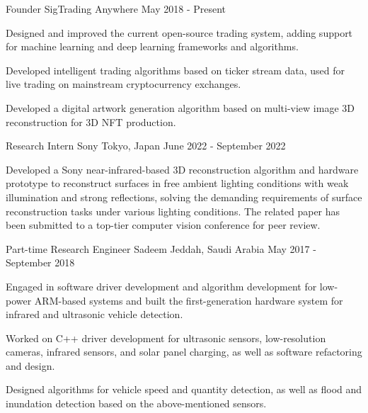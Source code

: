 

\begin{cventries}

\cventry
{Founder} %
{SigTrading} %
{Anywhere} %
{May 2018 - Present} %
{
	\begin{cvitems} %
		\item {Designed and improved the current open-source trading system, adding support for machine learning and deep learning frameworks and algorithms.}
		\item {Developed intelligent trading algorithms based on ticker stream data, used for live trading on mainstream cryptocurrency exchanges.}
		\item {Developed a digital artwork generation algorithm based on multi-view image 3D reconstruction for 3D NFT production.}
	\end{cvitems}
}

\cventry
{Research Intern} %
{Sony} %
{Tokyo, Japan} %
{June 2022 - September 2022} %
{
	\begin{cvitems} %
		\item {Developed a Sony near-infrared-based 3D reconstruction algorithm and hardware prototype to reconstruct surfaces in free ambient lighting conditions with weak illumination and strong reflections, solving the demanding requirements of surface reconstruction tasks under various lighting conditions. The related paper has been submitted to a top-tier computer vision conference for peer review.}
	\end{cvitems}
}

\cventry
{Part-time Research Engineer} %
{Sadeem} %
{Jeddah, Saudi Arabia} %
{May 2017 - September 2018} %
{
	\begin{cvitems} %
		\item {Engaged in software driver development and algorithm development for low-power ARM-based systems and built the first-generation hardware system for infrared and ultrasonic vehicle detection.}
		\item {Worked on C++ driver development for ultrasonic sensors, low-resolution cameras, infrared sensors, and solar panel charging, as well as software refactoring and design.}
		\item {Designed algorithms for vehicle speed and quantity detection, as well as flood and inundation detection based on the above-mentioned sensors.}
	\end{cvitems}
}


\end{cventries}

